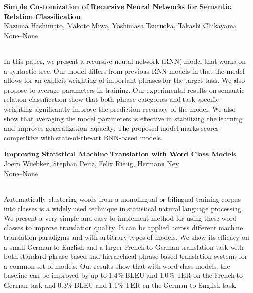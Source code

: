 \documentclass[twoside,makeidx]{book}
\renewcommand{\normalsize}{\fontsize{8}{9}\selectfont}
\renewcommand{\small}{\fontsize{7}{8}\selectfont}
\begin{document}
\par\vspace{2em}\noindent%
\begin{minipage}{\linewidth}%
\begin{center}
\textbf{\normalsize Simple Customization of Recursive Neural Networks for Semantic Relation Classification}\\
\normalsize  Kazuma Hashimoto,  Makoto Miwa,  Yoshimasa Tsuruoka,  Takashi Chikayama\\
{\small None--None}\\
\end{center}
\end{minipage}\\[0.5em]
\nopagebreak%
\noindent%
{\small In this paper, we present a recursive neural network (RNN) model that works on a syntactic tree. Our model differs from previous RNN models in that the model allows for an explicit weighting of important phrases for the target task. We also propose to average parameters in training. Our experimental results on semantic relation classification show that both phrase categories and task-specific weighting significantly improve the prediction accuracy of the model. We also show that averaging the model parameters is effective in stabilizing the learning and improves generalization capacity. The proposed model marks scores competitive with state-of-the-art RNN-based models.}
\par\vspace{2em}\noindent%
\begin{minipage}{\linewidth}%
\begin{center}
\textbf{\normalsize Improving Statistical Machine Translation with Word Class Models}\\
\normalsize  Joern Wuebker,  Stephan Peitz,  Felix Rietig,  Hermann Ney\\
{\small None--None}\\
\end{center}
\end{minipage}\\[0.5em]
\nopagebreak%
\noindent%
{\small Automatically clustering words from a monolingual or bilingual training corpus into classes is a widely used technique in statistical natural language processing. We present a very simple and easy to implement method for using these word classes to improve translation quality. It can be applied across different machine translation paradigms and with arbitrary types of models. We show its efficacy on a small German-to-English and a larger French-to-German translation task with both standard phrase-based and hierarchical phrase-based translation systems for a common set of models. Our results show that with word class models, the baseline can be improved by up to 1.4\% BLEU and 1.0\% TER on the French-to-German task and 0.3\% BLEU and 1.1\% TER on the German-to-English task.}
\end{document}
